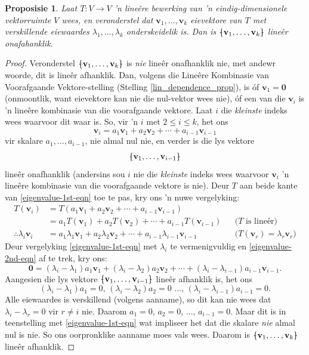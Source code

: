 \documentclass[a4paper,11pt]{book}
\newtheorem{proposition}[theorem]{Proposisie}
\theoremstyle{definition}
\newcommand{\ve}[1]{\mathbf{#1}}
\newcommand{\bmark}{\raisebox{.53ex}{\rule{.2em}{.1ex}}}
\newcommand{\bopen}{{\protect\ooalign{\{\cr\hfil\bmark\hfil\cr}}}
\newcommand{\bclose}{{\protect\ooalign{\}\cr\hfil\bmark\hfil\cr}}}
\begin{document}
\begin{proposition} \label{lin_ind_eig_distinct} Laat $T : V \rightarrow V$
	'n line{\^e}re bewerking van 'n eindig-dimensionele vektorruimte $V$ 
	wees, en veronderstel dat $\ve{v}_1, \ldots, \ve{v}_k$ eievektore van
	$T$ met verskillende eiewaardes $\lambda_1, \ldots, \lambda_k$
	onderskeidelik is. Dan is $\bopen \ve{v}_1, \ldots, \ve{v}_k \bclose$
	line{\^e}r onafahanklik.
\end{proposition}
\begin{proof}
	Veronderstel $\bopen \ve{v}_1, \ldots, \ve{v}_k \bclose$ is \emph{nie}
	line{\^e}r onafhanklik nie, met andewr woorde, dit is line{\^e}r
	afhanklik.  Dan, volgens die Line{\^e}re Kombinasie van Voorafgaande
	Vektore-stelling (Stelling \ref{lin_dependence_prop}), is {\'o}f
	$\ve{v}_1 = \ve{0}$ (onmoontlik, want eievektore kan nie die nul-vektor
	wees nie), {\'o}f een van die $\ve{v}_i$ is 'n line{\^e}re kombinasie
	van die voorafgaande vektore. Laat $i$ die \emph{kleinste} indeks wees
	waarvoor dit waar is. So, vir 'n $i$ met $2 \leq i \leq k$, het ons
	\begin{equation} \label{eigenvalue-1st-eqn}
		\ve{v}_i = a_1 \ve{v}_1 + a_2 \ve{v}_2 + \cdots + a_{i-1}
		\ve{v}_{i-1}
	\end{equation}
	vir skalare $a_1, \ldots, a_{i-1}$, nie almal nul nie, en verder is die
	lys vektore
	\[
		\bopen \ve{v}_1, \ldots, \ve{v}_{i-1} \bclose
	\]
	line{\^e}r onafhanklik (andersins sou $i$ nie die \emph{kleinste}
	indeks wees waarvoor $\ve{v}_i$ 'n line{\^e}re kombinasie van die
	voorafgaande vektore is nie). Deur $T$ aan beide kante van
	\eqref{eigenvalue-1st-eqn} toe te pas, kry ons 'n nuwe
	vergelyking:
	\begin{align}
		T(\ve{v}_i) &= T(  a_1 \ve{v}_1 + a_2 \ve{v}_2 + \cdots + a_{i-1}
		\ve{v}_{i-1}) \nonumber   \\
		&= a_1 T(\ve{v}_1) + a_2 T(\ve{v}_2) + \cdots + a_{i-1}
		T(\ve{v}_{i-1}) && \mbox{($T$ is line{\^e}r)}\nonumber \\
		\therefore \lambda_i \ve{v}_i &= a_1 \lambda_1 \ve{v}_1 + a_2
		\lambda_2 \ve{v}_2 + \cdots + a_{i-1} \lambda_{i-1} \ve{v}_{i-1} &&
		\mbox{($T(\ve{v}_r) = \lambda_r \ve{v}_r$)}
		\label{eigenvalue-2nd-eqn}
	\end{align}
	Deur vergelyking \eqref{eigenvalue-1st-eqn} met $\lambda_i$ te
	vermenigvuldig en \eqref{eigenvalue-2nd-eqn} af te trek, kry ons:
	\[
		\ve{0} = (\lambda_i - \lambda_1) a_1 \ve{v}_1 + (\lambda_i -
		\lambda_2) a_2 \ve{v}_2 + \cdots + (\lambda_i - \lambda_{i-1})
		a_{i-1} \ve{v}_{i-1}.
	\]
	Aangesien die lys vektore $\bopen \ve{v}_1, \ldots, \ve{v}_{i-1}
	\bclose$ line{\^e}r afhanklik is, het ons
	\[
		(\lambda_i - \lambda_1) a_1 =0, \, (\lambda_i - \lambda_2) a_2 =0\,
		\, \ldots, \,  (\lambda_i - \lambda_{i-1}) a_{i-1}=0.
	\] 
	Alle eiewaardes is verskillend (volgens aanname), so dit kan nie wees
	dat $\lambda_i - \lambda_r = 0$ vir $r \neq i$ nie. Daarom $a_1 = 0$,
	$a_2 = 0$, $\ldots$, $a_{i-1} = 0$. Maar dit is in teenstelling met
	\eqref{eigenvalue-1st-eqn} wat impliseer het dat die skalare
	\emph{nie} almal nul is nie. So ons oorpronklike aanname moes vals
	wees. Daarom is $\bopen \ve{v}_1, \ldots, \ve{v}_k \bclose$ line{\^e}r
	afhanklik.
\end{proof}
\end{document}
